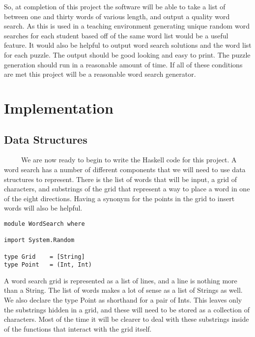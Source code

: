 \documentclass[12pt]{report}   %
\begin{document}
    \vspace{12pt}

    So, at completion of this project the software will be able to take a list
    of between one and thirty words of various length, and output a quality
    word search. As this is used in a teaching environment generating unique
    random word searches for each student based off of the same word list would
    be a useful feature. It would also be helpful to output word search 
    solutions and the word list for each puzzle. The output should be good 
    looking and easy to print. The puzzle generation should run in a reasonable
    amount of time. If all of these conditions are met this project will be a
    reasonable word search generator.

\chapter*{Implementation}     %

\section*{Data Structures}         %
    \ \ \ \ \ We are now ready to begin to write the Haskell code for this
    project. A word search has a number of different components that we will
    need to use data structures to represent. There is the list of words that
    will be input, a grid of characters, and substrings of the grid that
    represent a way to place a word in one of the eight directions. Having a
    synonym for the points in the grid to insert words will also be helpful.

    \vspace{12pt}

    \begin{lstlisting}    
module WordSearch where

import System.Random

type Grid    = [String]
type Point   = (Int, Int)
    \end{lstlisting}

    \vspace{12pt}

    A word search grid is represented as a list of lines, and a line is 
    nothing more than a String. The list of words makes a lot of sense as a 
    list of Strings as well. We also declare the type Point as shorthand for
    a pair of Ints. This leaves only the substrings hidden in a grid, and these
    will need to be stored as a collection of characters. Most of the time it
    will be clearer to deal with these substrings inside of the functions
    that interact with the grid itself.
\end{document}
